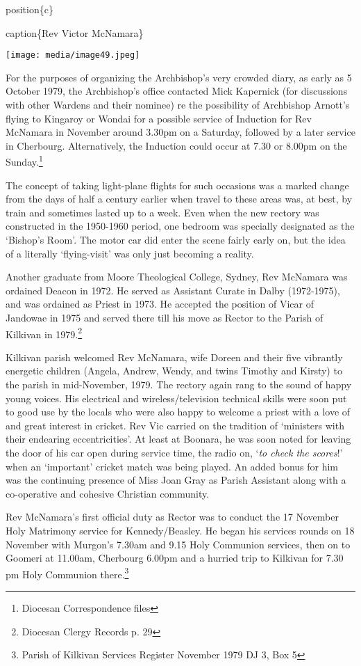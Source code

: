 position\{c\}

caption\{Rev Victor McNamara\}

\texttt{[image: media/image49.jpeg]}

For the purposes of organizing the Archbishop's very crowded diary, as early as 5 October 1979, the Archbishop's office contacted Mick Kapernick (for discussions with other Wardens and their nominee) re the possibility of Archbishop Arnott's flying to Kingaroy or Wondai for a possible service of Induction for Rev McNamara in November around 3.30pm on a Saturday, followed by a later service in Cherbourg. Alternatively, the Induction could occur at 7.30 or 8.00pm on the Sunday.\footnote{Diocesan Correspondence files}

The concept of taking light-plane flights for such occasions was a marked change from the days of half a century earlier when travel to these areas was, at best, by train and sometimes lasted up to a week. Even when the new rectory was constructed in the 1950-1960 period, one bedroom was specially designated as the `Bishop's Room'. The motor car did enter the scene fairly early on, but the idea of a literally `flying-visit' was only just becoming a reality.

Another graduate from Moore Theological College, Sydney, Rev McNamara was ordained Deacon in 1972. He served as Assistant Curate in Dalby (1972-1975), and was ordained as Priest in 1973. He accepted the position of Vicar of Jandowae in 1975 and served there till his move as Rector to the Parish of Kilkivan in 1979.\footnote{Diocesan Clergy Records p. 29}

Kilkivan parish welcomed Rev McNamara, wife Doreen and their five vibrantly energetic children (Angela, Andrew, Wendy, and twins Timothy and Kirsty) to the parish in mid-November, 1979. The rectory again rang to the sound of happy young voices. His electrical and wireless/television technical skills were soon put to good use by the locals who were also happy to welcome a priest with a love of and great interest in cricket. Rev Vic carried on the tradition of `ministers with their endearing eccentricities'. At least at Boonara, he was soon noted for leaving the door of his car open during service time, the radio on, `\emph{to check the scores}!' when an `important' cricket match was being played. An added bonus for him was the continuing presence of Miss Joan Gray as Parish Assistant along with a co-operative and cohesive Christian community.

Rev McNamara's first official duty as Rector was to conduct the 17 November Holy Matrimony service for Kennedy/Beasley. He began his services rounds on 18 November with Murgon's 7.30am and 9.15 Holy Communion services, then on to Goomeri at 11.00am, Cherbourg 6.00pm and a hurried trip to Kilkivan for 7.30 pm Holy Communion there.\footnote{Parish of Kilkivan Services Register November 1979 DJ 3, Box 5}


